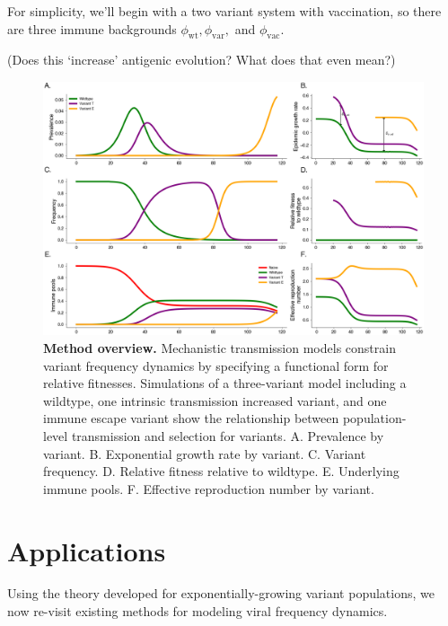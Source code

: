 \documentclass[12pt,oneside,letterpaper]{article}
\newcommand{\wt}{\text{wt}}
\newcommand{\var}{\text{var}}
\newcommand{\vac}{\text{vac}}
\begin{document}


For simplicity, we'll begin with a two variant system with vaccination, so there are three immune backgrounds $\phi_{\wt}, \phi_{\var},$ and $\phi_{\vac}$.

(Does this `increase' antigenic evolution? What does that even mean?)

\begin{figure}[h]
    \centering
    \includegraphics[width=0.8\linewidth]{./figures/vis_mechanisms.png}
    \caption{\textbf{Method overview.} 
    Mechanistic transmission models constrain variant frequency dynamics by specifying a functional form for relative fitnesses.
    Simulations of a three-variant model including a wildtype, one intrinsic transmission increased variant, and one immune escape variant show the relationship between population-level transmission and selection for variants.
    A. Prevalence by variant.
    B. Exponential growth rate by variant.
    C. Variant frequency.
    D. Relative fitness relative to wildtype.
    E. Underlying immune pools.
    F. Effective reproduction number by variant.
}%
    \label{fig:vis_mechanisms}
\end{figure}

\section*{Applications}

Using the theory developed for exponentially-growing variant populations, we now re-visit existing methods for modeling viral frequency dynamics.
\end{document}
